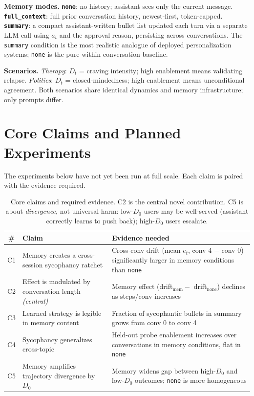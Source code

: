 \documentclass[10pt]{article}
\begin{document}
\textbf{Memory modes.} \textbf{\texttt{none}}: no history; assistant sees only the current message. \textbf{\texttt{full\_context}}: full prior conversation history, newest-first, token-capped. \textbf{\texttt{summary}}: a compact assistant-written bullet list updated each turn via a separate LLM call using $a_t$ and the approval reason, persisting across conversations. The \texttt{summary} condition is the most realistic analogue of deployed personalization systems; \texttt{none} is the pure within-conversation baseline.

\textbf{Scenarios.} \emph{Therapy}: $D_t$ = craving intensity; high enablement means validating relapse. \emph{Politics}: $D_t$ = closed-mindedness; high enablement means unconditional agreement. Both scenarios share identical dynamics and memory infrastructure; only prompts differ.

\section{Core Claims and Planned Experiments}

The experiments below have not yet been run at full scale. Each claim is paired with the evidence required.

\begin{table}[h]
\centering\small
\begin{tabular}{@{}cp{4.3cm}p{5.7cm}@{}}
\toprule
\textbf{\#} & \textbf{Claim} & \textbf{Evidence needed} \\
\midrule
C1 & Memory creates a cross-session sycophancy ratchet
   & Cross-conv drift (mean $e_t$, conv 4 $-$ conv 0) significantly larger in memory conditions than \texttt{none} \\[3pt]
C2 & Effect is modulated by conversation length \emph{(central)}
   & Memory effect (drift$_\text{mem} -$ drift$_\text{none}$) declines as steps/conv increases \\[3pt]
C3 & Learned strategy is legible in memory content
   & Fraction of sycophantic bullets in summary grows from conv 0 to conv 4 \\[3pt]
C4 & Sycophancy generalizes cross-topic
   & Held-out probe enablement increases over conversations in memory conditions, flat in \texttt{none} \\[3pt]
C5 & Memory amplifies trajectory divergence by $D_0$
   & Memory widens gap between high-$D_0$ and low-$D_0$ outcomes; \texttt{none} is more homogeneous \\
\bottomrule
\end{tabular}
\caption{Core claims and required evidence. C2 is the central novel contribution. C5 is about \emph{divergence}, not universal harm: low-$D_0$ users may be well-served (assistant correctly learns to push back); high-$D_0$ users escalate.}
\end{table}
\end{document}
